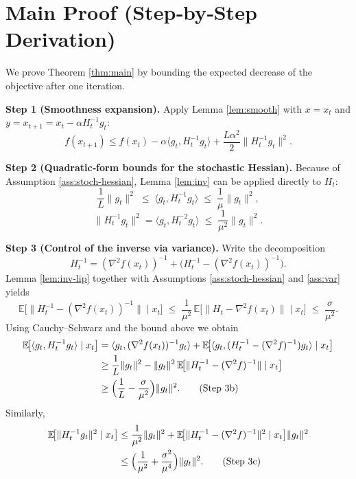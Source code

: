 \documentclass[11pt]{article}
\newcommand{\E}{\mathbb{E}}
\begin{document}
\section*{Main Proof (Step‑by‑Step Derivation)}
We prove Theorem \ref{thm:main} by bounding the expected decrease of the
objective after one iteration.

\medskip
\noindent\textbf{Step 1 (Smoothness expansion).}  
Apply Lemma \ref{lem:smooth} with $x=x_{t}$ and $y=x_{t+1}=x_{t}-\alpha H_{t}^{-1}g_{t}$:
\[
f(x_{t+1})\le f(x_{t})-\alpha\langle g_{t},H_{t}^{-1}g_{t}\rangle
+\frac{L\alpha^{2}}{2}\|H_{t}^{-1}g_{t}\|^{2}. \tag{Step 1}
\]

\noindent\textbf{Step 2 (Quadratic‑form bounds for the stochastic Hessian).}  
Because of Assumption \ref{ass:stoch-hessian}, Lemma \ref{lem:inv} can be applied
directly to $H_{t}$:
\[
\frac{1}{L}\|g_{t}\|^{2}\;\le\;\langle g_{t},H_{t}^{-1}g_{t}\rangle
\;\le\;\frac{1}{\mu}\|g_{t}\|^{2}, \tag{Step 2a}
\]
\[
\|H_{t}^{-1}g_{t}\|^{2}
= \langle g_{t},H_{t}^{-2}g_{t}\rangle
\;\le\;\frac{1}{\mu^{2}}\|g_{t}\|^{2}. \tag{Step 2b}
\]

\noindent\textbf{Step 3 (Control of the inverse via variance).}  
Write the decomposition
\[
H_{t}^{-1}= (\nabla^{2}f(x_{t}))^{-1}
+ \big(H_{t}^{-1}-(\nabla^{2}f(x_{t}))^{-1}\big).
\]
Lemma \ref{lem:inv-lip} together with Assumptions \ref{ass:stoch-hessian}
and \ref{ass:var} yields
\[
\E\!\big[\|H_{t}^{-1}-(\nabla^{2}f(x_{t}))^{-1}\|\mid x_{t}\big]
\;\le\; \frac{1}{\mu^{2}}\,
\E\!\big[\|H_{t}-\nabla^{2}f(x_{t})\|\mid x_{t}\big]
\;\le\; \frac{\sigma}{\mu^{2}} . \tag{Step 3a}
\]
Using Cauchy–Schwarz and the bound above we obtain
\[
\begin{aligned}
\E\!\big[\langle g_{t},H_{t}^{-1}g_{t}\rangle\mid x_{t}\big]
&= \langle g_{t},(\nabla^{2}f(x_{t}))^{-1}g_{t}\rangle
   + \E\!\big[\langle g_{t},(H_{t}^{-1}-(\nabla^{2}f)^{-1})g_{t}\rangle\mid x_{t}\big] \\
&\ge \frac{1}{L}\|g_{t}\|^{2}
   - \|g_{t}\|^{2}\,\E\!\big[\|H_{t}^{-1}-(\nabla^{2}f)^{-1}\|\mid x_{t}\big] \\
&\ge \Bigl(\frac{1}{L}-\frac{\sigma}{\mu^{2}}\Bigr)\|g_{t}\|^{2}. \tag{Step 3b}
\end{aligned}
\]
Similarly,
\[
\begin{aligned}
\E\!\big[\|H_{t}^{-1}g_{t}\|^{2}\mid x_{t}\big]
&\le \frac{1}{\mu^{2}}\|g_{t}\|^{2}
   + \E\!\big[\|H_{t}^{-1}-(\nabla^{2}f)^{-1}\|^{2}\mid x_{t}\big]\|g_{t}\|^{2} \\
&\le \Bigl(\frac{1}{\mu^{2}}+\frac{\sigma^{2}}{\mu^{4}}\Bigr)\|g_{t}\|^{2}. \tag{Step 3c}
\end{aligned}
\]
\end{document}
